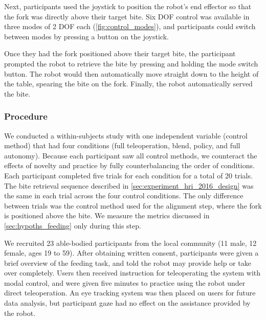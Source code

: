 Next, participants used the joystick to position the robot's end effector so that the fork was directly above their target bite. Six DOF control was available in three modes of 2 DOF each (\cref{fig:control_modes}), and participants could switch between modes by pressing a button on the joystick. 

Once they had the fork positioned above their target bite, the participant prompted the robot to retrieve the bite by pressing and holding the mode switch button. The robot would then automatically move straight down to the height of the table, spearing the bite on the fork. Finally, the robot automatically served the bite. 



\subsubsection{Procedure}
\label{sec:experiment_hri_2016_procedure}

We conducted a within-subjects study with one independent variable (control method) that had four conditions (full teleoperation, blend, policy, and full autonomy). Because each participant saw all control methods, we counteract the effects of novelty and practice by fully counterbalancing the order of conditions. Each participant completed five trials for each condition for a total of 20 trials. The bite retrieval sequence described in \cref{sec:experiment_hri_2016_design} was the same in each trial across the four control conditions. The only difference between trials was the control method used for the alignment step, where the fork is positioned above the bite. We measure the metrics discussed in \cref{sec:hypoths_feeding} only during this step.

We recruited 23 able-bodied participants from the local community (11 male, 12 female, ages 19 to 59). After obtaining written consent, participants were given a brief overview of the feeding task, and told the robot may provide help or take over completely. Users then received instruction for teleoperating the system with modal control, and were given five minutes to practice using the robot under direct teleoperation. An eye tracking system was then placed on users for future data analysis, but participant gaze had no effect on the assistance provided by the robot.

